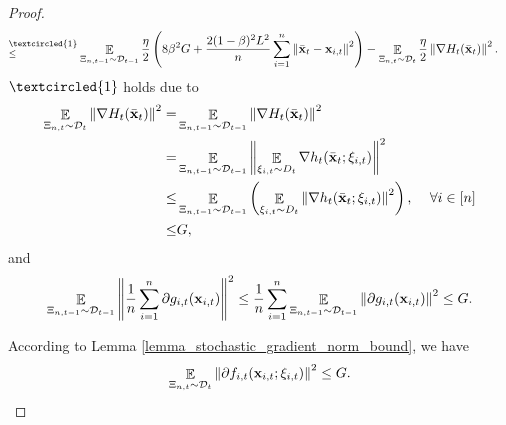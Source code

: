 \documentclass{article}
\begin{document}
\begin{proof}
\begin{align}
\refabovecir{\le}{\textcircled{1}} & \EE_{ \Xi_{n,t-1} \sim \Dcal_{t-1} } \frac{\eta}{2}\lrincir{ 8\beta^2 G + \frac{2(1-\beta)^2L^2}{n}\sum_{i=1}^n \lrnorm{ \bar{\x}_t - \x_{i,t} }^2 }  - \EE_{ \Xi_{n,t} \sim \Dcal_{t} } \frac{\eta}{2} \lrnorm{\nabla H_t(\bar{\x}_t)}^2.
\end{align} $\textcircled{1}$ holds due to 
\begin{align}
\nonumber
\mathop{\mathbb{E}}_{ \Xi_{n,t} \sim \mathcal{D}_{t} } \left\lVert\nabla H_t(\bar{{\bf x}}_t)\right\rVert^2 =  & \mathop{\mathbb{E}}_{ \Xi_{n,t-1} \sim \mathcal{D}_{t-1} } \left\lVert\nabla H_t(\bar{{\bf x}}_t)\right\rVert^2 \\ \nonumber
= & \mathop{\mathbb{E}}_{ \Xi_{n,t-1} \sim \mathcal{D}_{t-1} } \left\lVert\mathop{\mathbb{E}}_{\xi_{i,t}\sim D_t} \nabla h_t(\bar{{\bf x}}_t;\xi_{i,t})\right\rVert^2 \\ \nonumber
\le & \mathop{\mathbb{E}}_{ \Xi_{n,t-1} \sim \mathcal{D}_{t-1} } \left( \mathop{\mathbb{E}}_{\xi_{i,t}\sim D_t}\left\lVert\nabla h_t(\bar{{\bf x}}_t;\xi_{i,t})\right\rVert^2 \right) \text{,~~~~} \forall i\in[n]\\ \nonumber
\le & G,
\end{align} and 
\begin{align}
\nonumber
\mathop{\mathbb{E}}_{ \Xi_{n,t-1} \sim \mathcal{D}_{t-1} }\left\lVert\frac{1}{n}\sum_{i=1}^n \partial g_{i,t}({\bf x}_{i,t})\right\rVert^2 \le \frac{1}{n}\sum_{i=1}^n  \mathop{\mathbb{E}}_{ \Xi_{n,t-1} \sim \mathcal{D}_{t-1} }\left\lVert\partial g_{i,t}({\bf x}_{i,t})\right\rVert^2 \le G.
\end{align}




According to Lemma \ref{lemma_stochastic_gradient_norm_bound}, we have
\begin{align}
\label{equa_lemma_gradient_norm_temp2}
\mathop{\mathbb{E}}_{ \Xi_{n,t} \sim \mathcal{D}_{t} }\left\lVert \partial f_{i,t}({\bf x}_{i,t};\xi_{i,t})\right\rVert^2 \le G.
\end{align}


\end{proof}
\end{document}
